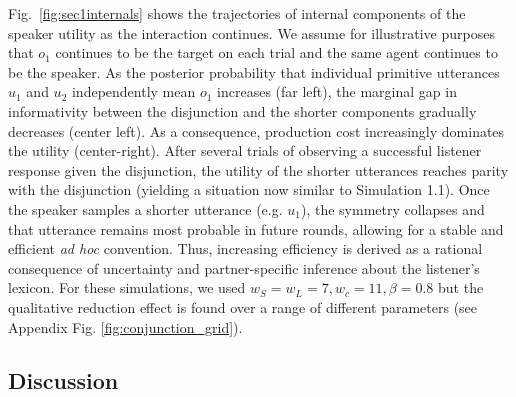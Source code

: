 Fig.~\ref{fig:sec1internals} shows the trajectories of internal components of the speaker utility as the interaction continues.
We assume for illustrative purposes that $o_1$ continues to be the target on each trial and the same agent continues to be the speaker.
As the posterior probability that individual primitive utterances $u_1$ and $u_2$ independently mean $o_1$ increases (far left), the marginal gap in informativity between the disjunction and the shorter components gradually decreases (center left).
As a consequence, production cost increasingly dominates the utility (center-right). 
After several trials of observing a successful listener response given the disjunction, the utility of the shorter utterances reaches parity with the disjunction (yielding a situation now similar to Simulation 1.1).
Once the speaker samples a shorter utterance (e.g. $u_1$), the symmetry collapses and that utterance remains most probable in future rounds, allowing for a stable and efficient \emph{ad hoc} convention.
Thus, increasing efficiency is derived as a rational consequence of uncertainty and partner-specific inference about the listener's lexicon.
For these simulations, we used $w_S = w_L = 7, w_c = 11, \beta=0.8$ but the qualitative reduction effect is found over a range of different parameters (see Appendix Fig. \ref{fig:conjunction_grid}). 
%
%
%




\subsection{Discussion}

